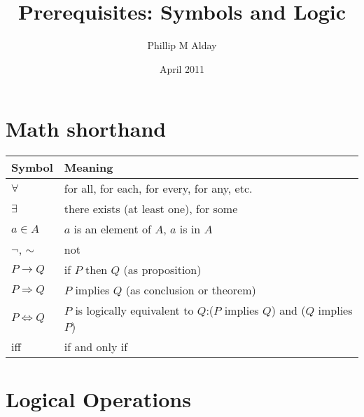 \documentclass[a4paper,12pt,oneside,leqno]{scrartcl}%
\title{Prerequisites: Symbols and Logic}
\author{Phillip M Alday}
\date{April 2011}
\begin{document}
\newtheorem{pos}{Postulate}[section]
\newtheorem{thm}{Theorem}[section]

\theoremstyle{definition}
\newtheorem{defn}{Definition}
\newtheorem*{definition}{Definition}

\maketitle

\section{Math shorthand}
\begin{center}
\begin{tabular}{l p{8cm}}
\toprule
Symbol & Meaning \\
\midrule
$\forall$ & for all, for each, for every, for any, etc.\\ 
$ \exists$ & there exists (at least one), for some \\ 
$a \in A$& $a$ is an element of $A$, $a$ is in $A$ \\ 
$\lnot$, $\sim{}$ & not \\
$P\rightarrow Q $ & if $P$ then $Q$ (as proposition) \\
$P \Rightarrow Q $ & $P$ implies $Q$ (as conclusion or theorem) \\
$P \Leftrightarrow Q$  & $P$ is logically equivalent to $Q$:\linebreak ($P$ implies $Q$) and ($Q$ implies $P$) \\
iff & if and only if\\
\bottomrule
\end{tabular}
\end{center}
\label{tab:symbols}

\section{Logical Operations}
\end{document}
